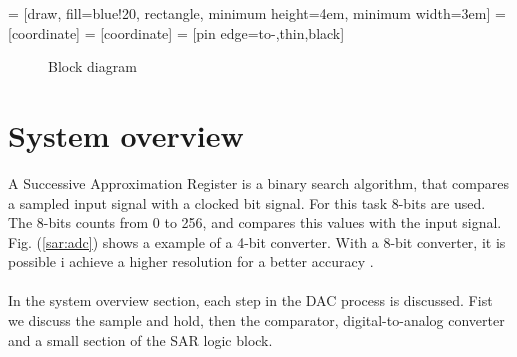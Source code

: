 \documentclass[english, 12pt, a4paper]{ifimaster}
\begin{document}
 = [draw, fill=blue!20, rectangle, 
    minimum height=4em, minimum width=3em]
 = [coordinate]
 = [coordinate]
 = [pin edge={to-,thin,black}]
\begin{figure}[!ht]
  \caption{Block diagram}
  \label{block_diagram}
\end{figure}
\section{System overview}
A Successive Approximation Register is a binary search algorithm, that compares a sampled input signal with a clocked bit signal. For this task 8-bits are used. The 8-bits counts from 0 to 256, and 
compares this values with the input signal. Fig. (\ref{sar:adc}) shows a example of a 4-bit converter. With a 8-bit converter, it is possible i achieve a higher resolution for a better accuracy \cite{sar-adc-concept}.\\
\\
In the system overview section, each step in the DAC process is discussed. Fist we discuss the sample and hold, then the comparator, digital-to-analog converter and a small section of 
the SAR logic block. 
\end{document}
